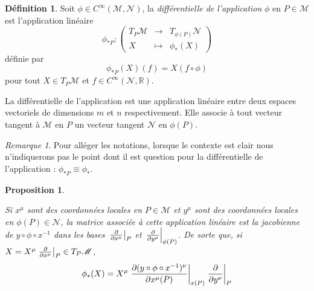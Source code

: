 \documentclass[a4paper,11pt]{report}
\theoremstyle{definition}
\theoremstyle{plain}
\newtheorem{prop}[thm]{Proposition}
\theoremstyle{definition}
\newtheorem{defn}{Définition}[chapter]
\theoremstyle{remark}
\newtheorem{rmk}{Remarque}[chapter]
\newcommand{\M}{\mathscr{M}}
\newcommand{\N}{\mathscr{N}}
\begin{document}
                \begin{defn}
                    Soit $\phi\in C^\infty(\M,\N)$, la \textit{différentielle de l'application} $\phi$ en $P\in\M$ est l'application linéaire
                    \begin{equation}
                        \phi_{*P}:\left(
                    \begin{array}{ccc}
                        T_P\M & \longrightarrow & T_{\phi(P)}\N \\
                        X & \longmapsto & \phi_*(X)
                    \end{array}
                    \right)
                    \end{equation}
                    définie par
                    \begin{equation}
                        \phi_{*P}(X)(f) = X(f\circ\phi)
                    \end{equation}
                    pour tout $X\in T_P\M$ et $f\in C^{\infty}(\N,\mathbb{R})$.
                \end{defn}
                
                La différentielle de l'application est une application linéaire entre deux espaces vectoriels de dimensions $m$ et $n$ respectivement. Elle associe à tout vecteur tangent à $\M$ en $P$ un vecteur tangent $\N$ en $\phi(P)$.
                
                \begin{rmk}
                    Pour alléger les notations, lorsque le contexte est clair nous n'indiquerons pas le point dont il est question pour la différentielle de l'application : $\phi_{*P}\equiv\phi_*$.
                \end{rmk}
                
                \begin{prop}\begin{leftbar}
                    Si $x^\mu$ sont des coordonnées locales en $P\in\M$ et $y^\mu$ sont des coordonnées locales en $\phi(P)\in\N$, la matrice associée à cette application linéaire est la jacobienne de $y\circ\phi\circ x^{-1}$ dans les bases $\eval{\pdv{}{x^\mu}}_{P}$ et  $\eval{\pdv{}{y^\mu}}_{\phi(P)}$. De sorte que, si $X = X^\mu\eval{\pdv{}{x^\mu}}_{P}\in T_P\M$, 
                    \begin{equation}
                        \phi_*(X) = X^\mu\eval{\pdv{(y\circ\phi\circ x^{-1})^\nu}{x^\mu(P)}(x^1(P),\dots,x^n(P))}_{x(P)}\eval{\pdv{}{y^\nu}}_{P}
                    \end{equation}
                \end{leftbar}\end{prop}
                
\end{document}
